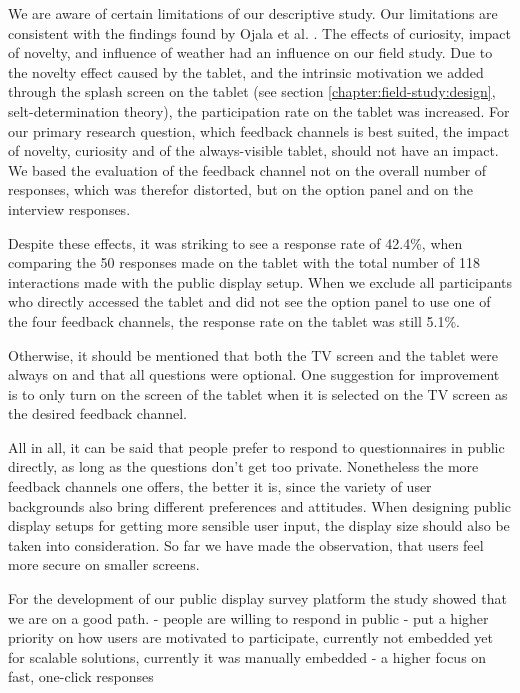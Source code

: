 
	We are aware of certain limitations of our descriptive study. Our limitations are consistent with the findings found by Ojala et al. \cite{Ojala2011}. The effects of curiosity, impact of novelty, and influence of weather had an influence on our field study. Due to the novelty effect caused by the tablet, and the intrinsic motivation we added through the splash screen on the tablet (see section \ref{chapter:field-study:design}, selt-determination theory), the participation rate on the tablet was increased. For our primary research question, which feedback channels is best suited, the impact of novelty, curiosity and of the always-visible tablet, should not have an impact. We based the evaluation of the feedback channel not on the overall number of responses, which was therefor distorted, but on the option panel and on the interview responses.

	Despite these effects, it was striking to see a response rate of 42.4\%, when comparing the 50 responses made on the tablet with the total number of 118 interactions made with the public display setup. When we exclude all participants who directly accessed the tablet and did not see the option panel to use one of the four feedback channels, the response rate on the tablet was still 5.1\%. 

	Otherwise, it should be mentioned that both the TV screen and the tablet were always on and that all questions were optional. One suggestion for improvement is to only turn on the screen of the tablet when it is selected on the TV screen as the desired feedback channel.



	All in all, it can be said that people prefer to respond to questionnaires in public directly, as long as the questions don't get too private. Nonetheless the more feedback channels one offers, the better it is, since the variety of user backgrounds also bring different preferences and attitudes. When designing public display setups for getting more sensible user input, the display size should also be taken into consideration. So far we have made the observation, that users feel more secure on smaller screens.	


	For the development of our public display survey platform the study showed that we are on a good path. 
		- people are willing to respond in public
		- put a higher priority on how users are motivated to participate, currently not embedded yet for scalable solutions, currently it was manually embedded
		- a higher focus on fast, one-click responses






